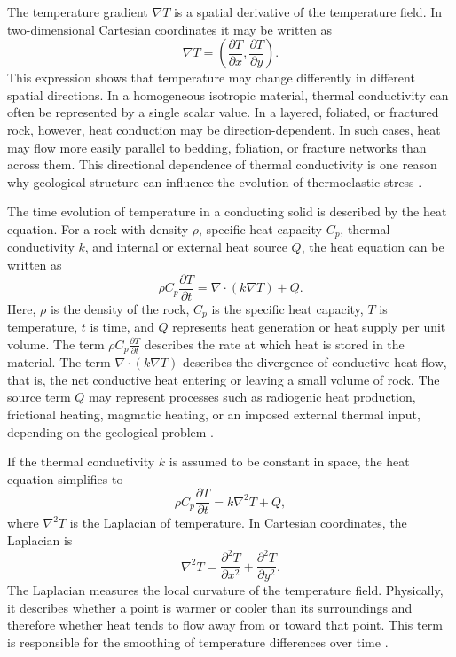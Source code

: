 The temperature gradient \(\nabla T\) is a spatial derivative of the temperature field. In two-dimensional Cartesian coordinates it may be written as
\begin{equation}
\nabla T =
\left(
\frac{\partial T}{\partial x},
\frac{\partial T}{\partial y}
\right).
\end{equation}
This expression shows that temperature may change differently in different spatial directions. In a homogeneous isotropic material, thermal conductivity can often be represented by a single scalar value. In a layered, foliated, or fractured rock, however, heat conduction may be direction-dependent. In such cases, heat may flow more easily parallel to bedding, foliation, or fracture networks than across them. This directional dependence of thermal conductivity is one reason why geological structure can influence the evolution of thermoelastic stress \cite{robertson1988,mavko2009}.

The time evolution of temperature in a conducting solid is described by the heat equation. For a rock with density \(\rho\), specific heat capacity \(C_p\), thermal conductivity \(k\), and internal or external heat source \(Q\), the heat equation can be written as
\begin{equation}
\label{eq:heat-conduction}
\rho C_p \frac{\partial T}{\partial t}
=
\nabla \cdot (k \nabla T) + Q.
\end{equation}
Here, \(\rho\) is the density of the rock, \(C_p\) is the specific heat capacity, \(T\) is temperature, \(t\) is time, and \(Q\) represents heat generation or heat supply per unit volume. The term \(\rho C_p \frac{\partial T}{\partial t}\) describes the rate at which heat is stored in the material. The term \(\nabla \cdot (k \nabla T)\) describes the divergence of conductive heat flow, that is, the net conductive heat entering or leaving a small volume of rock. The source term \(Q\) may represent processes such as radiogenic heat production, frictional heating, magmatic heating, or an imposed external thermal input, depending on the geological problem \cite{robertson1988,turcotte2014}.

If the thermal conductivity \(k\) is assumed to be constant in space, the heat equation simplifies to
\begin{equation}
\rho C_p \frac{\partial T}{\partial t}
=
k \nabla^2 T + Q,
\end{equation}
where \(\nabla^2 T\) is the Laplacian of temperature. In Cartesian coordinates, the Laplacian is
\begin{equation}
\nabla^2 T
=
\frac{\partial^2 T}{\partial x^2}
+
\frac{\partial^2 T}{\partial y^2}.
\end{equation}
The Laplacian measures the local curvature of the temperature field. Physically, it describes whether a point is warmer or cooler than its surroundings and therefore whether heat tends to flow away from or toward that point. This term is responsible for the smoothing of temperature differences over time \cite{turcotte2014}.

